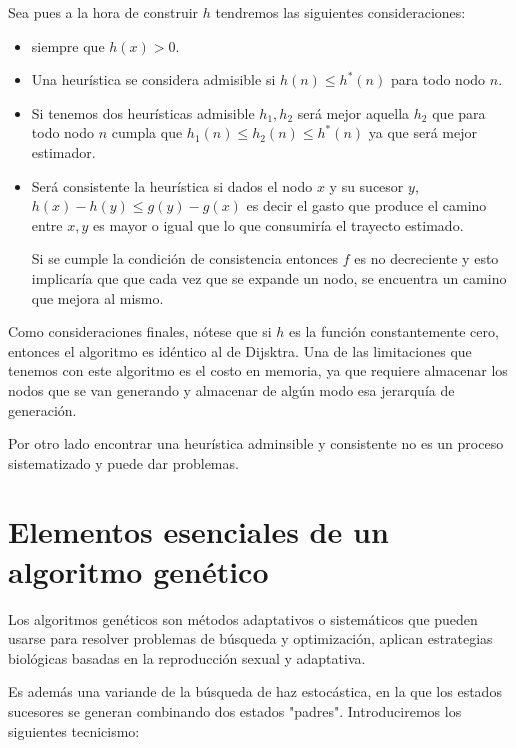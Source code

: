 \documentclass[12 pt, a4paper]{article}
\begin{document}
Sea pues a la hora de construir $h$ tendremos las siguientes consideraciones: 
\begin{itemize}
  \item siempre que $h(x) > 0.$
  \item Una heurística se considera admisible si $h(n) \leq h^*(n)$ para todo nodo $n.$
  \item Si tenemos dos heurísticas admisible $h_1, h_2$ será mejor aquella $h_2$ que para todo nodo $n$ cumpla que $h_1(n) \leq  h_2(n) \leq h^*(n)$ ya que será mejor
  estimador. 
  \item Será consistente  la heurística si dados el nodo $x$ y su sucesor $y$, $h(x)-h(y) \leq g(y)-g(x)$ es decir el gasto que produce el camino entre $x,y$ es mayor o igual 
  que lo que consumiría el trayecto estimado.
  
  Si se cumple la condición de consistencia entonces $f$ es no decreciente y esto implicaría que que cada vez que se expande un nodo, se encuentra un camino que mejora al mismo. 
\end{itemize}

Como consideraciones finales, nótese que si $h$ es la función constantemente cero, entonces el algoritmo es idéntico al de Dijsktra. 
Una de las limitaciones que tenemos con este algoritmo es el costo en memoria, ya que requiere almacenar los nodos que se van generando y almacenar de algún 
modo esa jerarquía de generación. 

Por otro lado encontrar una heurística adminsible y consistente no es un proceso sistematizado
y puede dar problemas. 

\newpage

\section{Elementos esenciales de un algoritmo genético}

Los algoritmos genéticos son métodos adaptativos o sistemáticos que pueden usarse para resolver problemas de búsqueda y optimización,
aplican estrategias biológicas basadas en la reproducción sexual y adaptativa. 

Es además una variande de la búsqueda de haz estocástica, en la que los estados sucesores se generan combinando dos estados "padres". 
Introduciremos los siguientes tecnicismo: 
\end{document}
